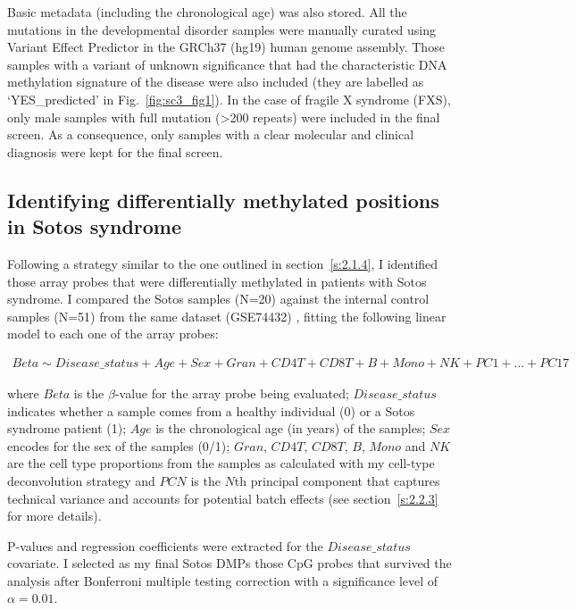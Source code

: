 \bigskip

Basic metadata (including the chronological age) was also stored. All the mutations in the developmental disorder samples were manually curated using Variant Effect Predictor \cite{McLaren2016} in the GRCh37 (\acrshort{hg19}) human genome assembly. Those samples with a variant of unknown significance that had the characteristic DNA methylation signature of the disease were also included (they are labelled as `YES\_predicted' in Fig.~\ref{fig:sc3_fig1}). In the case of fragile X syndrome (\acrshort{FXS}), only male samples with full mutation (>200 repeats) \cite{Schenkel2016} were included in the final screen. As a consequence, only samples with a clear molecular and clinical diagnosis were kept for the final screen.

\subsection*{Identifying differentially methylated positions in Sotos syndrome} 

Following a strategy similar to the one outlined in section~\ref{s:2.1.4}, I identified those array probes that were differentially methylated in patients with Sotos syndrome. I compared the Sotos samples (N=20) against the internal control samples (N=51) from the same dataset (GSE74432) \cite{Choufani2015}, fitting the following linear model to each one of the array probes:

\begin{align} \label{eq:3.1}
Beta \sim Disease\_status + Age + Sex+ Gran + CD4T + CD8T + B + Mono + NK + PC1 + ... + PC17
\end{align} 

where $Beta$ is the $\beta$-value for the array probe being evaluated; $Disease\_status$ indicates whether a sample comes from a healthy individual (0) or a Sotos syndrome patient (1); $Age$ is the chronological age (in years) of the samples; $Sex$ encodes for the sex of the samples (0/1); $Gran$, $CD4T$, $CD8T$, $B$, $Mono$ and $NK$ are the cell type proportions from the samples as calculated with my cell-type deconvolution strategy and $PCN$ is the $N$th principal component that captures technical variance and accounts for potential batch effects (see section~\ref{s:2.2.3} for more details).

\bigskip

P-values and regression coefficients were extracted for the $Disease\_status$ covariate. I selected as my final Sotos DMPs those CpG probes that survived the analysis after Bonferroni multiple testing correction with a significance level of $\alpha=0.01$. 


